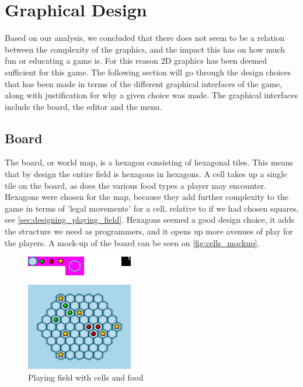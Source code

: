 \section{Graphical Design}
\label{sec:graphical_design}

Based on our analysis, we concluded that there does not seem to be a relation between the complexity of the graphics, and the impact this has on how much fun or educating a game is.
For this reason 2D graphics has been deemed sufficient for this game.
The following section will go through the design choices that has been made in terms of the different graphical interfaces of the game, along with justification for why a given choice was made. The graphical interfaces include the board, the editor and the menu.

\subsection{Board}
The board, or world map, is a hexagon consisting of hexagonal tiles.
This means that by design the entire field is hexagons in hexagons. 
A cell takes up a single tile on the board, as does the various food types a player may encounter.
Hexagons were chosen for the map, because they add further complexity to the game in terms of 'legal movements' for a cell, relative to if we had chosen squares, see \autoref{sec:designing_playing_field}.
Hexagons seemed a good design choice, it adds the structure we need as programmers, and it opens up more avenues of play for the players.
A mock-up of the board can be seen on \autoref{fig:cells_mockup}.\newline

\begin{figure}[h]
	\centering
		\includegraphics{img/cells_mockup.png}
	\caption{Playing field with cells and food}
	\label{fig:cells_mockup}
\end{figure}

